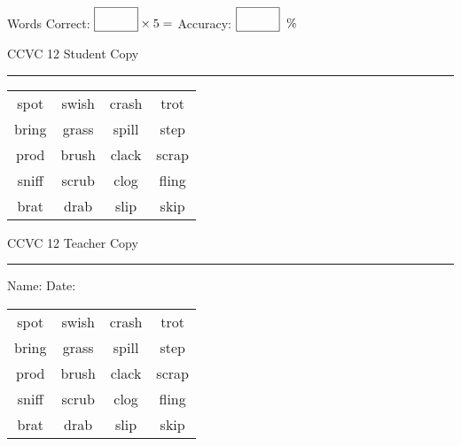 \documentclass{memoir}
\begin{document}
\normalsize

Words Correct: $\fbox{\phantom{\huge 100}} \times 5 = $ Accuracy: $\fbox{\phantom{\huge 100}}\;\; \%$ 

\vfill

\newpage


\footnotesize \noindent
CCVC 12 \hfill Student Copy
\smallskip
\hrule

\Large

\setlength{\tabcolsep}{14pt}
\def\arraystretch{3}

{\selectfont


\begin{vplace}[0.5]
\begin{center}
\begin{tabular}{cccc}
spot & swish & crash & trot \\
bring      & grass                    & spill & step \\
prod & brush & clack             & scrap \\
sniff & scrub & clog & fling \\
brat               & drab             & slip & skip \\
\end{tabular}
\end{center}
\end{vplace}

}

\newpage

\footnotesize \noindent
CCVC 12 \hfill Teacher Copy
\smallskip
\hrule

\normalsize

\vfill

\noindent
Name: \underline{\hspace{1.75in}} \hfill Date: \underline{\hspace{1in}}

\Large

{\selectfont


\begin{vplace}[0.5]
\begin{center}
\begin{tabular}{cccc}
spot & swish & crash & trot \\
bring      & grass                    & spill & step \\
prod & brush & clack             & scrap \\
sniff & scrub & clog & fling \\
brat               & drab             & slip & skip \\
\end{tabular}
\end{center}
\end{vplace}



}
\end{document}
